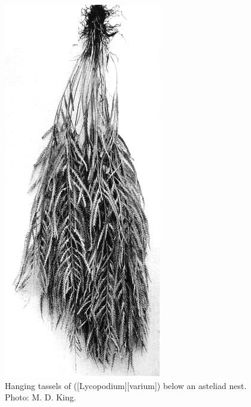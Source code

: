 \begin{figure}[!b]
\begin{minipage}[t]{0.7\textwidth}
\begin{minipage}[t]{(\textwidth-\fgap) * \real{0.564}}
			\caption[Hanging tassels of clubmoss (\emph{Lycopodium varium})]{Hanging tassels of  ([Lycopodium][varium]) below an asteliad nest.
			Photo: M. D. King.}%
			\label{fig:42lycopodium}
		\end{minipage}\hspace{\fgap}%
		\begin{minipage}[t]{(\textwidth-\fgap) * \real{0.436}}
			\centering
			\includegraphics[width=\textwidth]{graphics/figure43asplenium-jlaccidum.jpg}

\end{minipage}
\end{minipage}
\end{figure}
